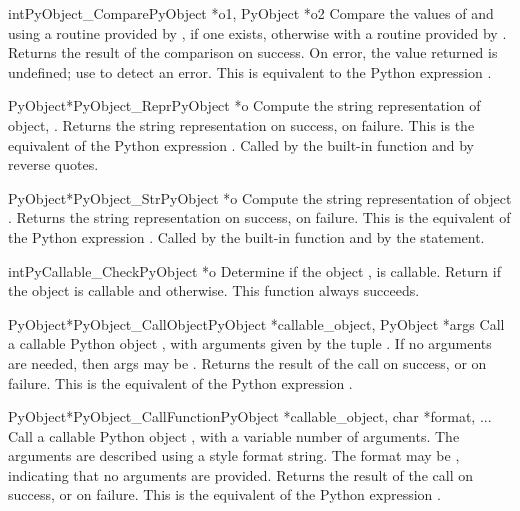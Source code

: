 \documentclass{manual}
\begin{document}
\begin{cfuncdesc}{int}{PyObject_Compare}{PyObject *o1, PyObject *o2}
Compare the values of  and  using a routine provided
by , if one exists, otherwise with a routine provided by
.  Returns the result of the comparison on success.  On error,
the value returned is undefined; use  to
detect an error.  This is equivalent to the
Python expression .
\end{cfuncdesc}


\begin{cfuncdesc}{PyObject*}{PyObject_Repr}{PyObject *o}
Compute the string representation of object, .  Returns the
string representation on success, \NULL{} on failure.  This is
the equivalent of the Python expression .
Called by the  built-in function
and by reverse quotes.
\end{cfuncdesc}


\begin{cfuncdesc}{PyObject*}{PyObject_Str}{PyObject *o}
Compute the string representation of object .  Returns the
string representation on success, \NULL{} on failure.  This is
the equivalent of the Python expression .
Called by the  built-in function and
by the  statement.
\end{cfuncdesc}


\begin{cfuncdesc}{int}{PyCallable_Check}{PyObject *o}
Determine if the object , is callable.  Return  if the
object is callable and  otherwise.
This function always succeeds.
\end{cfuncdesc}


\begin{cfuncdesc}{PyObject*}{PyObject_CallObject}{PyObject *callable_object, PyObject *args}
Call a callable Python object , with
arguments given by the tuple .  If no arguments are
needed, then args may be \NULL{}.  Returns the result of the
call on success, or \NULL{} on failure.  This is the equivalent
of the Python expression .
\end{cfuncdesc}

\begin{cfuncdesc}{PyObject*}{PyObject_CallFunction}{PyObject *callable_object, char *format, ...}
Call a callable Python object , with a
variable number of \C{} arguments. The \C{} arguments are described
using a  style format string. The format may
be \NULL{}, indicating that no arguments are provided.  Returns the
result of the call on success, or \NULL{} on failure.  This is
the equivalent of the Python expression .
\end{cfuncdesc}
\end{document}
